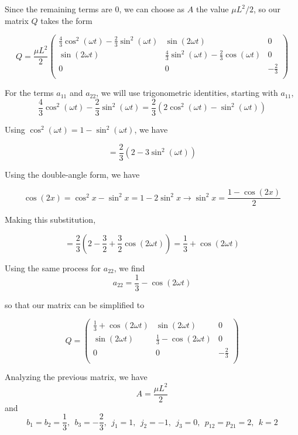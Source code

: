 \documentclass[11pt]{article}
\begin{document}
\begin{pproblem}
\begin{pssolution*}{}{}
\begin{alternativas}
        Since the remaining terms are \(0\), we can choose as \(A\) the value \(\mu L^2/2\), so our matrix \(Q\) takes the form

        \[Q = \frac{\mu L^2}{2}\left(\begin{matrix}
            \frac{4}{3}\cos^2(\omega t) - \frac{2}{3}\sin^2(\omega t)  & \sin(2\omega t) & 0 \\
            \sin(2\omega t) & \frac{4}{3}\sin^2(\omega t) - \frac{2}{3}\cos(\omega t) & 0 \\
            0 & 0 & -\frac{2}{3} \\
            \end{matrix}\right)\]

        For the terms \(a_{11}\) and \(a_{22}\), we will use trigonometric identities, starting with \(a_{11}\),
        \[\frac{4}{3}\cos^2(\omega t) - \frac{2}{3}\sin^2(\omega t) = \frac{2}{3}(2\cos^2(\omega t) - \sin^2(\omega t))\]

        Using \(\cos^2(\omega t) = 1-\sin^2(\omega t)\), we have

        \[ = \frac{2}{3}\left(2-3\sin^{2}(\omega t)\right)\]

        Using the double-angle form, we have

        \[\cos(2x) = \cos^2x -\sin^2x = 1-2\sin^2x \rightarrow \sin^2x = \frac{1-\cos(2x)}{2}\]

        Making this substitution,

        \[=\frac{2}{3}\left(2 - \frac{3}{2} + \frac{3}{2}\cos(2\omega t)\right) = \frac{1}{3}+\cos(2\omega t)\]

        Using the same process for \(a_{22}\), we find
        \[a_{22} = \frac{1}{3}-\cos(2\omega t)\]

        so that our matrix can be simplified to


        \[\boxed{Q = \left(\begin{matrix}
            \frac{1}{3}+\cos(2\omega t) & \sin(2\omega t) & 0 \\
            \sin(2\omega t) & \frac{1}{3} - \cos(2\omega t) & 0 \\
            0 & 0 & -\frac{2}{3} \\
        \end{matrix}\right)}\]

        \item Analyzing the previous matrix, we have
        \[\boxed{A = \frac{\mu L^2}{2}}\]
        and
        \[\boxed{b_1 = b_2 = \frac{1}{3}, \ \ b_3 = -\frac{2}{3}, \ \ j_1 = 1, \ \ j_2 = -1, \ \ j_3 = 0, \ \ p_{12}=p_{21} = 2, \ \ k= 2}\]


\end{alternativas}
\end{pssolution*}
\end{pproblem}
\end{document}
